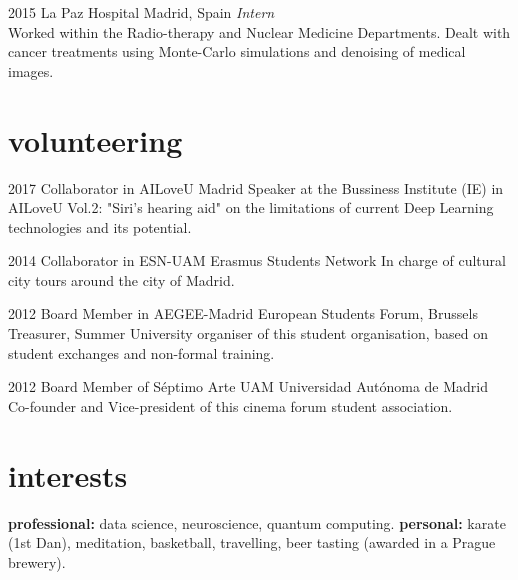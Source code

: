 \documentclass[]{friggeri-cv-a4}
\begin{document}


\begin{entrylist}

\entry
{2015}
{La Paz Hospital}
{Madrid, Spain}
{\emph{Intern} \\
Worked within the Radio-therapy and Nuclear Medicine Departments. Dealt with cancer treatments using Monte-Carlo simulations and denoising of medical images.
}


\end{entrylist}



\section{volunteering}

\begin{entrylist}

\entry
{2017}
{Collaborator in AILoveU}
{Madrid}
{Speaker at the Bussiness Institute (IE) in AILoveU Vol.2: "Siri's hearing aid" on the limitations of current Deep Learning technologies and its potential.}



\entry
{2014}
{Collaborator in ESN-UAM}
{Erasmus Students Network}
{In charge of cultural city tours around the city of Madrid.}


\entry
{2012}
{Board Member in AEGEE-Madrid}
{European Students Forum, Brussels}
{Treasurer, Summer University organiser of this student organisation, based on student exchanges and non-formal training.}


\entry
{2012}
{Board Member of Séptimo Arte UAM}
{Universidad Autónoma de Madrid}
{Co-founder and Vice-president of this cinema forum student association.}


\end{entrylist}


\section{interests}

\textbf{professional:} data science, neuroscience, quantum computing. \textbf{personal:} karate (1st Dan), meditation, basketball, travelling, beer tasting (awarded in a Prague brewery).
\end{document}
